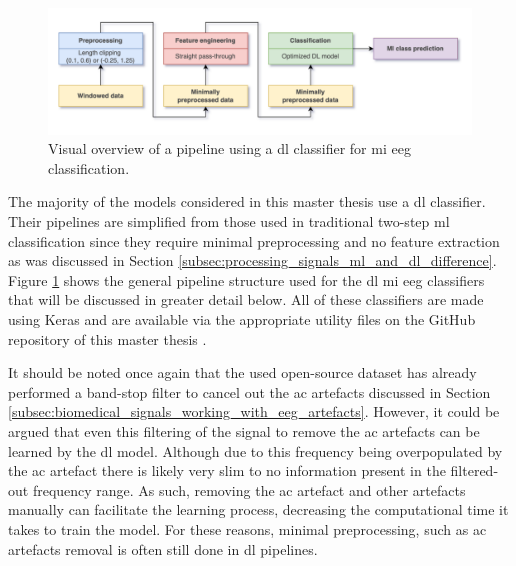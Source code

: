 \begin{figure}[t]
    \centering
    \includegraphics[width=\linewidth]{../images/pipeline/dl_pipeline.pdf}
    \captionsetup{width=0.8\linewidth}
    \captionsetup{justification=centering}
    \caption{Visual overview of a pipeline using a \gls{dl} classifier for \gls{mi} \gls{eeg} classification.}
    \label{fig:offline_bci_system_dl_pipeline}
\end{figure}

The majority of the models considered in this master thesis use a \gls{dl} classifier.
Their pipelines are simplified from those used in traditional two-step \gls{ml} classification since they require minimal preprocessing and no feature extraction as was discussed in Section \ref{subsec:processing_signals_ml_and_dl_difference}.
Figure \ref{fig:offline_bci_system_dl_pipeline} shows the general pipeline structure used for the \gls{dl} \gls{mi} \gls{eeg} classifiers that will be discussed in greater detail below.
All of these classifiers are made using Keras and are available via the appropriate utility files on the GitHub repository of this master thesis \citep{github_project, keras}.

It should be noted once again that the used open-source dataset has already performed a band-stop filter to cancel out the \gls{ac} artefacts discussed in Section \ref{subsec:biomedical_signals_working_with_eeg_artefacts}.
However, it could be argued that even this filtering of the signal to remove the \gls{ac} artefacts can be learned by the \gls{dl} model.
Although due to this frequency being overpopulated by the \gls{ac} artefact there is likely very slim to no information present in the filtered-out frequency range.
As such, removing the \gls{ac} artefact and other artefacts manually can facilitate the learning process, decreasing the computational time it takes to train the model.
For these reasons, minimal preprocessing, such as \gls{ac} artefacts removal is often still done in \gls{dl} pipelines.



